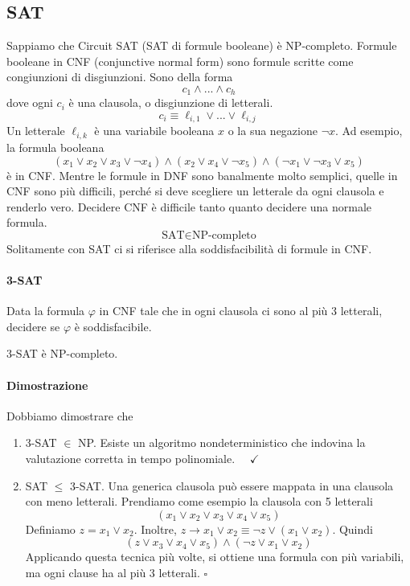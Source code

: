 \subsection{SAT}
Sappiamo che Circuit SAT (SAT di formule booleane) è NP-completo. Formule booleane in CNF (conjunctive normal form) sono formule scritte come congiunzioni di disgiunzioni. Sono della forma
$$
    c_1 \land ... \land c_h
$$
dove ogni $c_i$ è una clausola, o disgiunzione di letterali. 
$$
    c_i \equiv \ell_{i,1} \lor ... \lor \ell_{i,j}
$$
Un letterale $\ell_{i,k}$ è una variabile booleana $x$ o la sua negazione $\lnot x$. Ad esempio, la formula booleana
$$
    (x_1\lor x_2\lor x_3\lor\lnot x_4) \land
    (x_2\lor x_4\lor\lnot x_5) \land
    (\lnot x_1\lor\lnot x_3\lor x_5)
$$
è in CNF. Mentre le formule in DNF sono banalmente molto semplici, quelle in CNF sono più difficili, perché si deve scegliere un letterale da ogni clausola e renderlo vero. Decidere CNF è difficile tanto quanto decidere una normale formula.
$$
    \text{SAT} \in \text{NP-completo}
$$
Solitamente con SAT ci si riferisce alla soddisfacibilità di formule in CNF.

\paragraph{3-SAT} Data la formula $\varphi$ in CNF tale che in ogni clausola ci sono al più 3 letterali, decidere se $\varphi$ è soddisfacibile. 

\begin{theorem}
    3-SAT è NP-completo.
\end{theorem}
\paragraph{Dimostrazione} Dobbiamo dimostrare che 
\begin{enumerate}
    \item 3-SAT $\in$ NP. Esiste un algoritmo nondeterministico che indovina la valutazione corretta in tempo polinomiale. $\quad \checkmark$
    \item SAT $\leq$ 3-SAT. Una generica clausola può essere mappata in una clausola con meno letterali. Prendiamo come esempio la clausola con 5 letterali 
    $$
        (x_1 \lor x_2 \lor x_3 \lor x_4 \lor x_5)
    $$
    Definiamo $z=x_1\lor x_2$. Inoltre, $z\to x_1\lor x_2\equiv \lnot z\lor(x_1\lor x_2)$. Quindi
    $$
        (z \lor x_3 \lor x_4 \lor x_5) \land (\lnot z \lor x_1 \lor x_2)
    $$
    Applicando questa tecnica più volte, si ottiene una formula con più variabili, ma ogni clause ha al più 3 letterali. \hfill$\square$
\end{enumerate}


